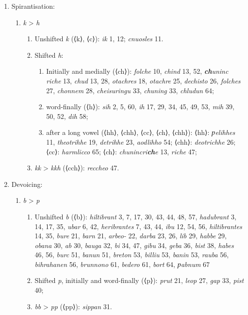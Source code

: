 \begin{enumerate}
  \item Spirantisation: \begin{enumerate}%
    \item \emph{k} > \emph{h} \begin{enumerate}
      \item Unshifted \emph{k} (⟨k⟩, ⟨c⟩): \emph{ik} 1, 12; \emph{cnuosles} 11.
      \item Shifted \emph{h}: \begin{enumerate}
        \item Initially and medially (⟨ch⟩): \emph{folche} 10, \emph{chind} 13, 52, \emph{\textbf{ch}uninc\- riche} 13, \emph{chud} 13, 28, \emph{otachres} 18, \emph{otachre} 25, \emph{dechisto} 26, \emph{folches} 27, \emph{chonnem} 28, \emph{cheisuringu} 33, %
        \emph{chuning} 33, \emph{chludun} 64;
        \item word-finally (⟨h⟩): \emph{sih} 2, 5, 60, \emph{ih} 17, 29, 34, 45, 49, 53, \emph{mih} 39, 50, 52, \emph{dih} 58; %
        \item after a long vowel (⟨hh⟩, ⟨chh⟩, ⟨cc⟩, ⟨ch⟩, ⟨chh⟩): ⟨hh⟩: \emph{ƿelihhes} 11, \emph{theotrihhe} 19, \emph{detrihhe} 23, \emph{aodlihho} 54; ⟨chh⟩: \emph{deotrichhe} 26; ⟨cc⟩: \emph{harmlicco} 65; ⟨ch⟩: \emph{chunincri\textbf{ch}e} 13, \emph{riche} 47;
      \end{enumerate}%
      \item \emph{kk} > \emph{kkh} (⟨cch⟩): \emph{reccheo} 47. %
    \end{enumerate}%
  \end{enumerate}%

  \item Devoicing: \begin{enumerate}%
    \item \emph{b} > \emph{p} \begin{enumerate}
      \item Unshifted \emph{b} (⟨b⟩):
      \emph{hiltibrant} 3, 7, 17, 30, 43, 44, 48, 57, \emph{hadubrant} 3, 14, 17, 35, \emph{ubar} 6, 42, \emph{heribrantes} 7, 43, 44, \emph{ibu} 12, 54, 56, \emph{hiltibrantes} 14, 35, \emph{bure} 21, \emph{barn} 21, \emph{arbeo-} 22, \emph{darba} 23, 26, \emph{lib} 29, \emph{habbe} 29, \emph{obana} 30, \emph{ab} 30, %
      \emph{bauga} 32, \emph{bi} 34, 47, \emph{gibu} 34, \emph{geba} 36, \emph{bist} 38, \emph{habes} 46, 56, \emph{burc} 51, \emph{banun} 51, \emph{breton} 53, \emph{billiu} 53, \emph{banin} 53, \emph{rauba} 56, \emph{bihrahanen} 56, \emph{brunnono} 61, \emph{bedero} 61, %
      \emph{bort} 64, \emph{ƿabnum} 67
      \item Shifted \emph{p}, initially and word-finally (⟨p⟩): \emph{prut} 21, \emph{leop} 27, \emph{gap} 33, \emph{pist} 40; %
      \item \emph{bb} > \emph{pp} (⟨pp⟩): \emph{sippan} 31.
    \end{enumerate}


\end{enumerate}
\end{enumerate}
